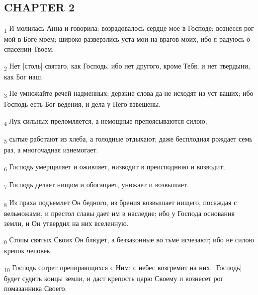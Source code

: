 \subsection{CHAPTER 2}
\begin{tcolorbox}
\textsubscript{1} И молилась Анна и говорила: возрадовалось сердце мое в Господе; вознесся рог мой в Боге моем; широко разверзлись уста мои на врагов моих, ибо я радуюсь о спасении Твоем.
\end{tcolorbox}
\begin{tcolorbox}
\textsubscript{2} Нет [столь] святаго, как Господь; ибо нет другого, кроме Тебя; и нет твердыни, как Бог наш.
\end{tcolorbox}
\begin{tcolorbox}
\textsubscript{3} Не умножайте речей надменных; дерзкие слова да не исходят из уст ваших; ибо Господь есть Бог ведения, и дела у Него взвешены.
\end{tcolorbox}
\begin{tcolorbox}
\textsubscript{4} Лук сильных преломляется, а немощные препоясываются силою;
\end{tcolorbox}
\begin{tcolorbox}
\textsubscript{5} сытые работают из хлеба, а голодные отдыхают; даже бесплодная рождает семь раз, а многочадная изнемогает.
\end{tcolorbox}
\begin{tcolorbox}
\textsubscript{6} Господь умерщвляет и оживляет, низводит в преисподнюю и возводит;
\end{tcolorbox}
\begin{tcolorbox}
\textsubscript{7} Господь делает нищим и обогащает, унижает и возвышает.
\end{tcolorbox}
\begin{tcolorbox}
\textsubscript{8} Из праха подъемлет Он бедного, из брения возвышает нищего, посаждая с вельможами, и престол славы дает им в наследие; ибо у Господа основания земли, и Он утвердил на них вселенную.
\end{tcolorbox}
\begin{tcolorbox}
\textsubscript{9} Стопы святых Своих Он блюдет, а беззаконные во тьме исчезают; ибо не силою крепок человек.
\end{tcolorbox}
\begin{tcolorbox}
\textsubscript{10} Господь сотрет препирающихся с Ним; с небес возгремит на них. [Господь] будет судить концы земли, и даст крепость царю Своему и вознесет рог помазанника Своего.
\end{tcolorbox}

